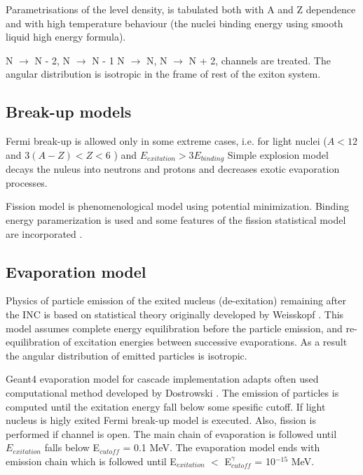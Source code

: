 Parametrisations of the level density, is tabulated both with A and Z dependence and with high temperature 
behaviour (the nuclei binding energy using smooth liquid high energy formula).

N $\rightarrow$ N - 2, N $\rightarrow$ N - 1 N $\rightarrow$ N, N $\rightarrow$ N + 2,  channels are treated.
The angular distribution is isotropic in the frame of rest of the exiton system.

\subsection{Break-up models}


Fermi break-up is allowed only in some extreme cases, i.e. for light nuclei ($A < 12$ and  $3 (A - Z) < Z < 6$ ) and $E_{exitation} > 3 E_{binding}$ 
Simple explosion model decays the nuleus into neutrons and protons and decreases exotic evaporation processes.


Fission model is phenomenological model using potential minimization. Binding energy paramerization is used and
some features of the fission statistical model are incorporated \cite{fong69}.

\subsection{Evaporation model}

Physics of particle emission of the exited nucleus (de-exitation) remaining after the INC is based on statistical theory
originally developed by Weisskopf \cite{weisskopf37}. 
This model assumes complete energy equilibration before the particle emission, and re-equilibration of excitation energies between successive evaporations. 
As a result the angular distribution of emitted particles is isotropic.

{\sc Geant4} evaporation model for cascade implementation adapts often used computational method developed by Dostrowski \cite{dostrovsky59, dostrovsky60}.
The emission of particles is computed until the exitation energy fall below some spesific cutoff. 
If light nucleus is higly exited Fermi break-up model is executed. Also, fission is performed if channel is open. 
The main chain of evaporation is followed until  $E_{exitation}$ falls below E$_{cutoff}$ = 0.1 MeV. 
The evaporation model ends with  emission chain which is followed until E$_{exitation}$ $<$ E$^{\gamma}_{cutoff}$ = 10$^{-15}$ MeV.

